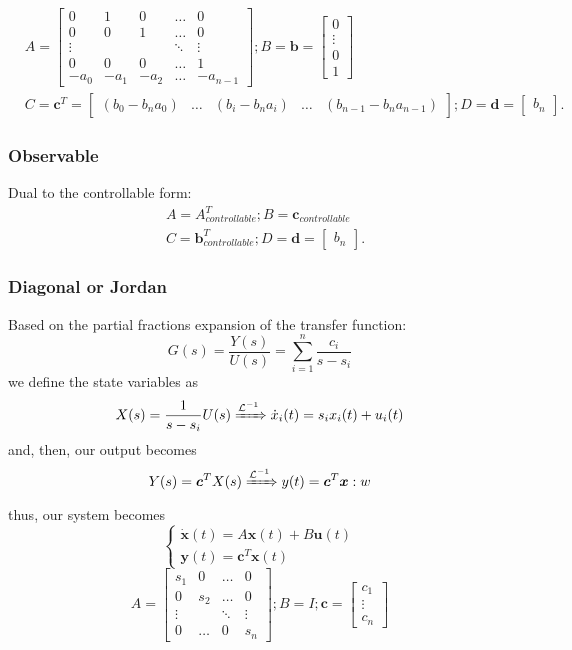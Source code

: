 \documentclass[a4paper]{report}
\begin{document}
\begin{align*}
    &A = \begin{bmatrix}
	0 & 1 & 0 & \ldots & 0 \\ 
	0 & 0 & 1 & \ldots & 0 \\
	\vdots &  &  & \ddots & \vdots \\
	0 & 0 & 0 & \ldots & 1 \\
	-a_0 & -a_1 & -a_2 & \ldots & -a_{n-1}
	\end{bmatrix}; B = \bm{b} = \begin{bmatrix} 0 \\ \vdots \\ 0 \\ 1 \end{bmatrix} \\
	     &C = \bm{c}^{T} = \begin{bmatrix} (b_0 - b_na_0) & \ldots & (b_i - b_na_i) & \ldots & (b_{n-1} - b_na_{n-1}) \end{bmatrix} ; D = \bm{d} = \begin{bmatrix} b_n \end{bmatrix} 
.\end{align*}

\subsubsection*{Observable}

Dual to the controllable form:
\begin{align*}
    &A = A_{controllable}^{T}; B = \bm{c}_{controllable} \\
	     &C = \bm{b}_{controllable}^{T} ; D = \bm{d} = \begin{bmatrix} b_n \end{bmatrix} 
.\end{align*}

\subsubsection*{Diagonal or Jordan}

Based on the partial fractions expansion of the transfer function: \[
    G(s) = \frac{Y(s)}{U(s)} = \sum_{i=1}^{n} \frac{c_i}{s-s_i}
\] we define the state variables as \[
X(s) = \frac{1}{s-s_i}U(s) \xRightarrow{\mathcal{L}^{-1}} \dot{x}_i(t) = s_ix_i(t) + u_i(t)
\] and, then, our output becomes \[
Y(s) = \bm{c}^{T}X(s) \xRightarrow{\mathcal{L}^{-1}} y(t) = \bm{c}^{T}\bm{x}:w
\] thus, our system becomes \[
    \begin{cases}
	\bm{\dot{x}}(t) = A\bm{x}(t) + B\bm{u}(t) \\
	\bm{y}(t) = \bm{c}^{T}\bm{x}(t)
    \end{cases}
\] \[
    A =
    \begin{bmatrix}
	s_1 & 0 & \ldots & 0 \\
	0 & s_2 & \ldots & 0 \\
	\vdots & & \ddots & \vdots \\
	0 & \ldots & 0 & s_n
	\end{bmatrix} ; B = I ; \bm{c} = \begin{bmatrix} c_1 \\ \vdots \\ c_n \end{bmatrix} 
\] 
\end{document}
